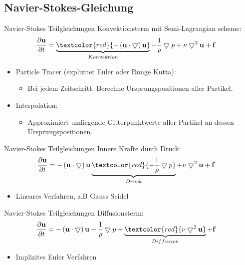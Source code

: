 \documentclass{beamer}
\begin{document}
 \subsection{Navier-Stokes-Gleichung}
\begin{frame}{Navier-Stokes Teilgleichungen}
	Konvektionsterm mit Semi-Lagrangian scheme:
	\begin{align*}
	  \frac{\partial \mathbf{u}}{\partial t} &= \underbrace{\textcolor{red}{- \left( \mathbf{u} \cdot \bigtriangledown \right) \mathbf{u}}}_{\substack{Konvektion}} - \frac{1}{\rho} \bigtriangledown p + \nu \bigtriangledown^2 \mathbf{u} + \mathbf{f}
	\end{align*}
	\begin{itemize}
	\item  Particle Tracer (expliziter Euler oder Runge Kutta):
	\begin{itemize}
	\item  Bei jedem Zeitschritt: Berechne Ursprungspositionen aller Partikel.
	\end{itemize}
	\item Interpolation:
	\begin{itemize}
	\item Approximiert umliegende Gitterpunktwerte aller Partikel an dessen Ursprungspositionen.
	\end{itemize}
	\end{itemize}
\end{frame}

\begin{frame}{Navier-Stokes Teilgleichungen}
	Innere Kr\"afte durch Druck:
	\begin{align*}
	  \frac{\partial \mathbf{u}}{\partial t} &= - \left( \mathbf{u} \cdot \bigtriangledown \right) \mathbf{u} \underbrace{\textcolor{red}{- \frac{1}{\rho} \bigtriangledown p}}_{\substack{Druck}} + \nu \bigtriangledown^2 \mathbf{u} + \mathbf{f}
	\end{align*}
	\begin{itemize}
	\item  Lineares Verfahren, z.B Gauss Seidel
	\end{itemize}
\end{frame}

\begin{frame}{Navier-Stokes Teilgleichungen}
	Diffusionsterm:
	\begin{align*}
 	 \frac{\partial \mathbf{u}}{\partial t} &= - \left( \mathbf{u} \cdot \bigtriangledown \right) \mathbf{u} - \frac{1}{\rho} \bigtriangledown p + \underbrace{\textcolor{red}{\nu \bigtriangledown^2 \mathbf{u}}}_{\substack{Diffusion}} + \mathbf{f}
	\end{align*}
	\begin{itemize}
	\item  Implizites Euler Verfahren
	\end{itemize}
\end{frame}
\end{document}
